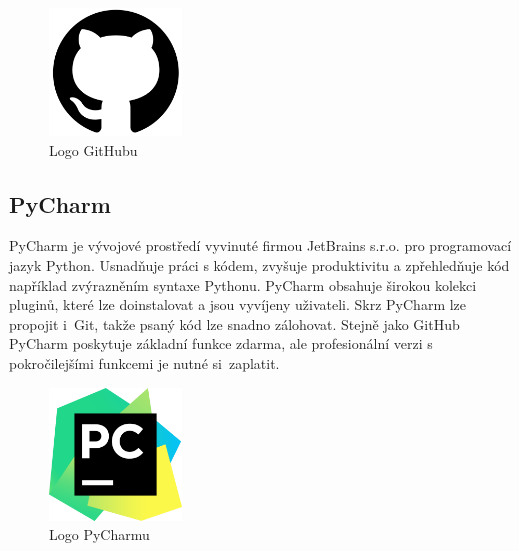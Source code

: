 \begin{figure}[H] \centering
    \includegraphics[width=100pt]{./pictures/github.png}
    \caption[Logo GitHubu]{Logo GitHubu \cite{github}}
	\label{fig:github}                                
\end{figure} 

\subsection{PyCharm}

PyCharm je vývojové prostředí vyvinuté firmou JetBrains s.r.o. pro programovací jazyk Python.
Usnadňuje práci s kódem, zvyšuje produktivitu a zpřehledňuje kód například zvýrazněním syntaxe Pythonu.
PyCharm obsahuje širokou kolekci plu\-ginů, které lze doinstalovat a jsou vyvíjeny uživateli.
Skrz PyCharm lze propojit i~Git, takže psaný kód lze snadno zálohovat. Stejně jako GitHub PyCharm poskytuje 
základní funkce zdarma, ale profesionální verzi s pokročilejšími funkcemi je nutné si~zaplatit.

\begin{figure}[H] \centering
    \includegraphics[width=100pt]{./pictures/pycharm.png}
    \caption[Logo PyCharmu]{Logo PyCharmu \cite{pycharm}}
	\label{fig:pycharm}                                
\end{figure} 
 